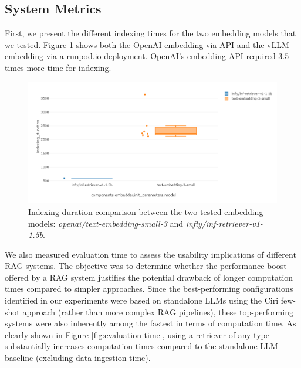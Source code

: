 \subsection{System Metrics}

First, we present the different indexing times for the two embedding models that we tested. Figure \ref{fig:indexing-time} shows both the OpenAI embedding via API and the vLLM embedding via a runpod.io deployment. OpenAI's embedding API required 3.5 times more time for indexing.

\begin{figure}[!ht]
    \centering
    \includegraphics[width=\textwidth]{images/indexing-time.png}
    \caption{Indexing duration comparison between the two tested embedding models: \textit{openai/text-embedding-small-3} and \textit{infly/inf-retriever-v1-1.5b}.}
    \label{fig:indexing-time}
\end{figure}

We also measured evaluation time to assess the usability implications of different RAG systems. The objective was to determine whether the performance boost offered by a RAG system justifies the potential drawback of longer computation times compared to simpler approaches. Since the best-performing configurations identified in our experiments were based on standalone LLMs using the Ciri few-shot approach (rather than more complex RAG pipelines), these top-performing systems were also inherently among the fastest in terms of computation time. As clearly shown in Figure \ref{fig:evaluation-time}, using a retriever of any type substantially increases computation times compared to the standalone LLM baseline (excluding data ingestion time). 

